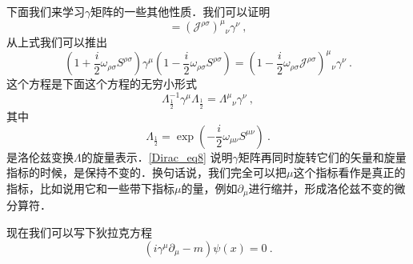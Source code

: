 下面我们来学习$\gamma$矩阵的一些其他性质．我们可以证明
\begin{equation}
[\gamma^\mu,S^{\rho\sigma}] = (\mathcal J^{\rho\sigma})^\mu{}_\nu \gamma^\nu ~,
\end{equation}
从上式我们可以推出
\begin{equation}
(1+\frac{i}{2}\omega_{\rho\sigma}S^{\rho\sigma})\gamma^\mu (1-\frac{i}{2}\omega_{\rho\sigma}S^{\rho\sigma}) = (1-\frac{i}{2}\omega_{\rho\sigma}\mathcal J^{\rho\sigma})^\mu{}_\nu \gamma^\nu~.
\end{equation}
这个方程是下面这个方程的无穷小形式
\begin{equation}\label{Dirac_eq8}
\Lambda^{-1}_{\frac{1}{2}}\gamma^\mu\Lambda_{\frac{1}{2}}= \Lambda^\mu{}_\nu\gamma^\nu~,
\end{equation}
其中
\begin{equation}
\Lambda_{\frac{1}{2}} = \exp (-\frac{i}{2}\omega_{\mu\nu}S^{\mu\nu})~. 
\end{equation}
是洛伦兹变换$\Lambda$的旋量表示．\autoref{Dirac_eq8} 说明$\gamma$矩阵再同时旋转它们的矢量和旋量指标的时候，是保持不变的．换句话说，我们完全可以把$\mu$这个指标看作是真正的指标，比如说用它和一些带下指标$\mu$的量，例如$\partial_\mu$进行缩并，形成洛伦兹不变的微分算符．

现在我们可以写下狄拉克方程
\begin{equation}
(i\gamma^\mu \partial_\mu - m)\psi(x)=0~.
\end{equation}
